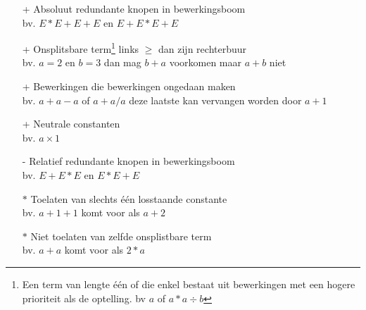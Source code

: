 \documentclass[Main.tex]{subfiles}
\begin{document}
\begin{itemize}
\item[+] Absoluut redundante knopen in bewerkingsboom\\
bv. $E \ast E+E+E$ en $E+E \ast E+E$
\item[+] Onsplitsbare term\footnote{\label{note:onsplitsbaar}Een term van lengte \'e\'en of die enkel bestaat uit bewerkingen met een hogere prioriteit als de optelling. bv $a$ of $a \ast a \div b$}
links $\geq$ dan zijn rechterbuur\\
	bv. $a=2$ en $b=3$ dan mag $b+a$ voorkomen maar $a+b$ niet
\item[+] Bewerkingen die bewerkingen ongedaan maken\\
	bv. $a+a-a$ of $a+a/a$ deze laatste kan vervangen worden door $a+1$
\item[+] Neutrale constanten\\
	bv. $a \times 1$
\item[-] Relatief redundante knopen in bewerkingsboom\\
	bv. $E+E \ast E$ en $E \ast E+E$
\item[$\ast$] Toelaten van slechts één losstaande constante \\
	bv. $a+1+1$ komt voor als $a+2$
\item[$\ast$] Niet toelaten van zelfde onsplistbare term\footnotemark[\ref{note:onsplitsbaar}]\\
	bv. $a+a$ komt voor als $2 \ast a$
\end{itemize}
\end{document}
